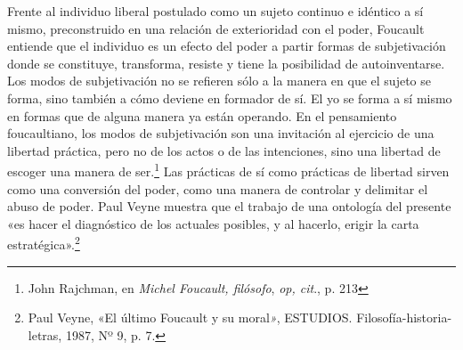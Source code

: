 Frente al individuo liberal postulado como un sujeto continuo e idéntico a sí mismo, preconstruido en una relación de exterioridad con el poder, Foucault entiende que el individuo es un efecto del poder a partir formas de subjetivación donde se constituye, transforma, resiste y tiene la posibilidad de autoinventarse. Los modos de subjetivación no se refieren sólo a la manera en que el sujeto se forma, sino también a cómo deviene en formador de sí. El yo se forma a sí mismo en formas que de alguna manera ya están operando. En el pensamiento foucaultiano, los modos de subjetivación son una invitación al ejercicio de una libertad práctica, pero no de los actos o de las intenciones, sino una libertad de escoger una manera de ser.\footnote{John Rajchman, en \emph{Michel Foucault, filósofo}, \emph{op, cit}., p. 213} Las prácticas de sí como prácticas de libertad sirven como una conversión del poder, como una manera de controlar y delimitar el abuso de poder. Paul Veyne muestra que el trabajo de una ontología del presente «es hacer el diagnóstico de los actuales posibles, y al hacerlo, erigir la carta estratégica».\footnote{Paul Veyne, «El último Foucault y su moral\emph{»}, ESTUDIOS. Filosofía-historia-letras, 1987, Nº 9, p. 7.}

